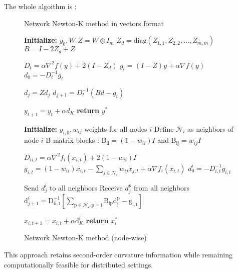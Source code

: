 \documentclass[10pt,english]{article}
\begin{document}
The whole algoithm is :
\begin{figure}[h!]
\begin{minipage}[t]{0.48\textwidth}
\begin{algorithm}[H]
\caption{Network Newton-K method in vectors format}
\begin{algorithmic}[1]
\State \textbf{Initialize:} $y_0 , W $
\State $Z = W \otimes I_m$
\State $Z_d = \text{diag}(Z_{1,1}, Z_{2,2}, \ldots, Z_{m,m})$ 
\State $B = I - 2Z_d + Z$ 
 
    \State $D_t = \alpha \nabla^2 f(y) + 2(I - Z_d)$
    \State $g_t = (I - Z) y + \alpha\nabla f (y)$ 
    \State $d_0 = -D_t^{-1}  g_t$ 
    
        \State $d_j = Z d_j$ 
        \State $d_{j+1} = D_t^{-1} (B d - g_t)$ 
    \EndFor
    
    \State $y_{t+1} = y_t + \alpha d_K$
\EndFor
\State \textbf{return} $y^*$
\end{algorithmic}
\end{algorithm}
\end{minipage}
\hfill
\begin{minipage}[t]{0.48\textwidth}
\begin{algorithm}[H]
\caption{Network Newton-K method (node-wise)}
\begin{algorithmic}[1]
\State \textbf{Initialize:} $y_{i,0} , w_{ij} $ weights for all nodes $i$
\State Define $\mathcal{N}_i$ as neighbors of node $i$
\State $\mathrm{B}$ matrix blocks : $\mathrm{B_{ii}} = (1-w_{ii})I$ and $\mathrm{B_{ij}} = w_{ij}I$

    \State $D_{ii,t} = \alpha \nabla^2 f_i(x_{i,t}) + 2(1 - w_{ii})I$
    \State $g_{i,t} = (1 - w_{ii})x_{i,t} - \sum_{j \in \mathcal{N}_i} w_{ij}x_{j,t} + \alpha\nabla f_i(x_{i,t})$ 
    \State $d_{0}^{i} = -D_{i,t}^{-1}  g_{i,t}$ 
    
        \State Send $d_{j}^{i}$ to all neighbors
        \State Receive $d_{j}^{p}$ from all neighbors
        \State $\mathrm{d}_{j+1}^{i} = \mathrm{D_{ii,t}^{-1}\left[ \sum_{p\in \mathcal{N_i}, p=i} B_{ip} d_{j}^{p} - g_{i,t}\right]}$
    \EndFor
    
    \State $x_{i,t+1} = x_{i,t} + \alpha \mathrm{d}_{K}^{i}$
\EndFor
\State \textbf{return} $x_i^*$
\end{algorithmic}
\end{algorithm}
\end{minipage}
\end{figure}
\newpage
This approach retains second-order curvature information while remaining computationally feasible for distributed settings.
\end{document}
